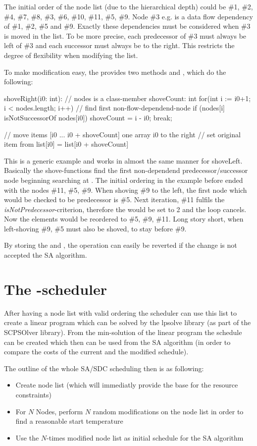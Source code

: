 The initial order of the node list (due to the hierarchical depth) could be \#1, \#2, \#4, \#7, \#8, \#3, \#6, \#10, \#11, \#5, \#9. Node \#3 e.g. is a data flow dependency of \#1, \#2, \#5 and \#9. Exactly these dependencies must be considered when \#3 is moved in the list. To be more precise, each predecessor of \#3 must always be left of \#3 and each successor must always be to the right. This restricts the degree of flexibility when modifying the list.\par
To make modification easy, the  provides two methods  and , which do the following:

%
%
shoveRight(i0: int):
	// nodes is a class-member
	shoveCount: int
	for(int i := i0+1; i < nodes.length; i++)
		// find first non-flow-dependend-node
		if (nodes[i] isNotSuccessorOf nodes[i0])
			shoveCount = i - i0;
			break;

	// move items  [i0 ... i0 + shoveCount] one array i0 to the right
	// set original item from list[i0] = list[i0 + shoveCount]

This is a generic example and works in almost the same manner for shoveLeft. Basically the shove-functions find the first non-dependend predecessor/successor node beginning searching at . The initial ordering in the example before ended with the nodes \#11, \#5, \#9. When shoving \#9 to the left, the first node which would be checked to be predecessor is \#5. Next iteration, \#11 fulfils the \textit{isNotPredecessor}-criterion, therefore the  would be set to 2 and the loop cancels. Now the elements would be reordered to \#5, \#9, \#11. Long story short, when left-shoving \#9, \#5 must also be shoved, to stay before \#9.\par
By storing the  and , the operation can easily be reverted if the change is not accepted the SA algorithm.\par

\section{The -scheduler}
After having a node list with valid ordering the scheduler can use this list to create a linear program which can be solved by the lpsolve library (as part of the SCPSOlver library). From the min-solution of the linear program the schedule can be created which then can be used from the SA algorithm (in order to compare the costs of the current and the modified schedule).\par
The outline of the whole SA/SDC scheduling then is as following:
\begin{itemize}
	\item{Create node list (which will immediatly provide the base for the resource constraints)}
	\item{For $N$ Nodes, perform $N$ random modifications on the node list in order to find a reasonable start temperature}
	\item{Use the $N$-times modified node list as initial schedule for the SA algorithm}
\end{itemize}

